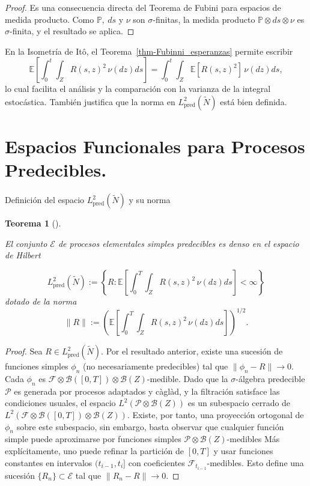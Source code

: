 \documentclass[
  spanish,
  us-letterpaper,
]{scrreprt}
\theoremstyle{plain}
\newtheorem{theorem}{Teorema}[chapter]
\theoremstyle{plain}
\theoremstyle{definition}
\theoremstyle{remark}
\begin{document}
\begin{proof}
Es una consecuencia directa del Teorema de Fubini para espacios de
medida producto. Como \(\mathbb{P}, \ ds\) y \(\nu\) son
\(\sigma\)-finitas, la medida producto
\(\mathbb{P} \otimes ds \otimes \nu\) es \(\sigma\)-finita, y el
resultado se aplica.
\end{proof}

En la Isometría de Itô, el Teorema~\ref{thm-Fubinni_esperanzas} permite
escribir
\[\mathbb{E}\left[ \int_0^t \int_Z R(s,z)^2 \, \nu(dz) ds \right] = \int_0^t \int_Z \mathbb{E}[R(s,z)^2] \, \nu(dz) ds,\]
lo cual facilita el análisis y la comparación con la varianza de la
integral estocástica. También justifica que la norma en
\(L^2_{\text{pred}}(\widetilde{N})\) está bien definida.

\section{Espacios Funcionales para Procesos
Predecibles.}\label{sec-proc_predecibles}

Definición del espacio \(L^2_{\text{pred}}(\widetilde{N})\) y su norma

\begin{theorem}[]\protect\hypertarget{thm-den_esp_pro_simp_prede_L2}{}\label{thm-den_esp_pro_simp_prede_L2}

El conjunto \(\mathcal{E}\) de procesos elementales simples predecibles
es denso en el espacio de Hilbert

\[L^2_{\text{pred}}(\widetilde{N}) := \left\{ R : \mathbb{E}\!\left[ \int_0^T \int_Z R(s,z)^2 \, \nu(dz) ds \right] < \infty \right\}\]
dotado de la norma
\[\|R\| := \left( \mathbb{E}\!\left[ \int_0^T \int_Z R(s,z)^2 \, \nu(dz) ds \right] \right)^{1/2}.\]

\end{theorem}

\begin{proof}
Sea \(R \in L^2_{\text{pred}}(\widetilde{N})\). Por el resultado
anterior, existe una sucesión de funciones simples \(\phi_n\) (no
necesariamente predecibles) tal que \(\|\phi_n - R\| \to 0\). Cada
\(\phi_n\) es
\(\mathcal{F} \otimes \mathcal{B}([0,T]) \otimes \mathcal{B}(Z)\)-medible.
Dado que la \(\sigma\)-álgebra predecible \(\mathcal{P}\) es generada
por procesos adaptados y càglàd, y la filtración satisface las
condiciones usuales, el espacio
\(L^2(\mathcal{P} \otimes \mathcal{B}(Z))\) es un subespacio cerrado de
\(L^2(\mathcal{F} \otimes \mathcal{B}([0,T]) \otimes \mathcal{B}(Z))\).
Existe, por tanto, una proyección ortogonal de \(\phi_n\) sobre este
subespacio, sin embargo, basta observar que cualquier función simple
puede aproximarse por funciones simples
\(\mathcal{P} \otimes \mathcal{B}(Z)\)-medibles
\autocite{applebaum2009levy} Más explícitamente, uno puede refinar la
partición de \([0,T]\) y usar funciones constantes en intervalos
\((t_{i-1}, t_i]\) con coeficientes \(\mathcal{F}_{t_{i-1}}\)-medibles.
Esto define una sucesión \(\{R_n\} \subset \mathcal{E}\) tal que
\(\|R_n - R\| \to 0.\)
\end{proof}
\end{document}

